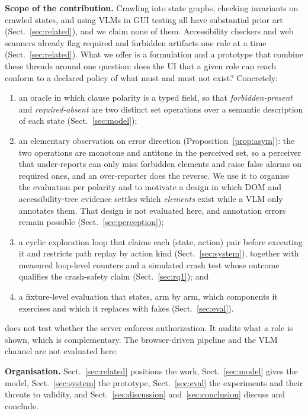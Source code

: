 \medskip\noindent\textbf{Scope of the contribution.}
Crawling into state graphs, checking invariants on crawled states, and using VLMs in
GUI testing all have substantial prior art (Sect.~\ref{sec:related}), and we claim
none of them. Accessibility checkers and web scanners already flag required and
forbidden artifacts one rule at a time (Sect.~\ref{sec:related}). What we offer is
a formulation and a prototype that combine these threads around one question:
does the UI that a given role can reach conform to a declared policy of what must
and must not exist? Concretely:
\begin{enumerate}
\item an oracle in which clause polarity is a typed field, so that
\emph{forbidden-present} and \emph{required-absent} are two distinct set operations
over a semantic description of each state (Sect.~\ref{sec:model});
\item an elementary observation on error direction (Proposition~\ref{prop:asym}):
the two operations are monotone and antitone in the perceived set, so a perceiver
that under-reports can only miss forbidden elements and raise false alarms on
required ones, and an over-reporter does the reverse. We use it to organise the
evaluation per polarity and to motivate a design in which DOM and accessibility-tree
evidence settles which \emph{elements} exist while a VLM only annotates them. That
design is not evaluated here, and annotation errors remain possible
(Sect.~\ref{sec:perception});
\item a cyclic exploration loop that claims each (state, action) pair before
executing it and restricts path replay by action kind
(Sect.~\ref{sec:system}), together with measured loop-level counters and a
simulated crash test whose outcome qualifies the crash-safety claim
(Sect.~\ref{sec:rq1}); and
\item a fixture-level evaluation that states, arm by arm, which components it
exercises and which it replaces with fakes (Sect.~\ref{sec:eval}).
\end{enumerate}
\sys{} does not test whether the server enforces authorization. It audits what a
role is shown, which is complementary. The browser-driven pipeline and the VLM channel are not evaluated here.

\medskip\noindent\textbf{Organisation.}
Sect.~\ref{sec:related} positions the work, Sect.~\ref{sec:model} gives the model,
Sect.~\ref{sec:system} the prototype, Sect.~\ref{sec:eval} the experiments and
their threats to validity, and Sect.~\ref{sec:discussion} and~\ref{sec:conclusion}
discuss and conclude.

